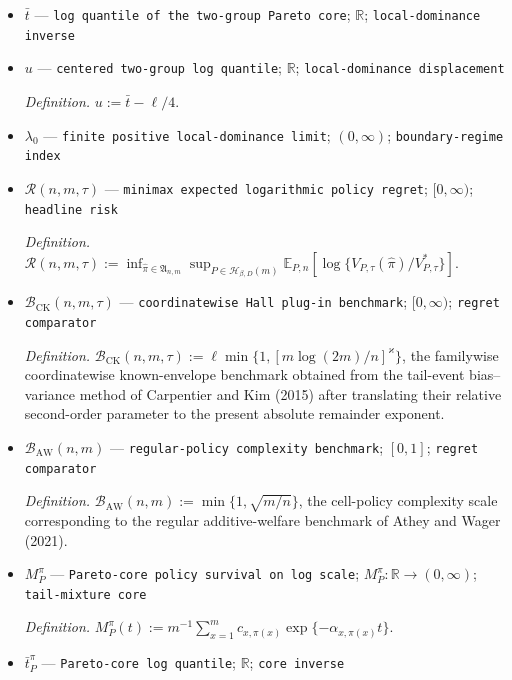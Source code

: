 \documentclass{article}
\begin{document}
\begin{itemize}
  \par\smallskip\noindent\emph{Definition.} \(\lambda:=f\tau^{-(1-a/4)}\).
  \item \(\bar t\) --- \texttt{log quantile of the two-\allowbreak{}group Pareto core}; \(\mathbb R\); \texttt{local-\allowbreak{}dominance inverse}
  \item \(u\) --- \texttt{centered two-\allowbreak{}group log quantile}; \(\mathbb R\); \texttt{local-\allowbreak{}dominance displacement}
  \par\smallskip\noindent\emph{Definition.} \(u:=\bar t-\ell/4\).
  \item \(\lambda_0\) --- \texttt{finite positive local-\allowbreak{}dominance limit}; \((0,\infty)\); \texttt{boundary-\allowbreak{}regime index}
  \item \(\mathcal R(n,m,\tau)\) --- \texttt{minimax expected logarithmic policy regret}; \([0,\infty)\); \texttt{headline risk}
  \par\smallskip\noindent\emph{Definition.} \(\mathcal R(n,m,\tau):=\inf_{\widehat\pi\in\mathfrak A_{n,m}}\sup_{P\in\mathcal H_{\beta,D}(m)}\mathbb E_{P,n}[\log\{V_{P,\tau}(\widehat\pi)/V^*_{P,\tau}\}]\).
  \item \(\mathcal B_{\mathrm{CK}}(n,m,\tau)\) --- \texttt{coordinatewise Hall plug-\allowbreak{}in benchmark}; \([0,\infty)\); \texttt{regret comparator}
  \par\smallskip\noindent\emph{Definition.} \(\mathcal B_{\mathrm{CK}}(n,m,\tau):=\ell\min\{1,[m\log(2m)/n]^{\varkappa}\}\), the familywise coordinatewise known-envelope benchmark obtained from the tail-event bias--variance method of Carpentier and Kim (2015) after translating their relative second-order parameter to the present absolute remainder exponent.
  \item \(\mathcal B_{\mathrm{AW}}(n,m)\) --- \texttt{regular-\allowbreak{}policy complexity benchmark}; \([0,1]\); \texttt{regret comparator}
  \par\smallskip\noindent\emph{Definition.} \(\mathcal B_{\mathrm{AW}}(n,m):=\min\{1,\sqrt{m/n}\}\), the cell-policy complexity scale corresponding to the regular additive-welfare benchmark of Athey and Wager (2021).
  \item \(M_P^{\pi}\) --- \texttt{Pareto-\allowbreak{}core policy survival on log scale}; \(M_P^{\pi}:\mathbb R\to(0,\infty)\); \texttt{tail-\allowbreak{}mixture core}
  \par\smallskip\noindent\emph{Definition.} \(M_P^{\pi}(t):=m^{-1}\sum_{x=1}^m c_{x,\pi(x)}\exp\{-\alpha_{x,\pi(x)}t\}\).
  \item \(\bar t_P^{\pi}\) --- \texttt{Pareto-\allowbreak{}core log quantile}; \(\mathbb R\); \texttt{core inverse}

\end{itemize}
\end{document}
